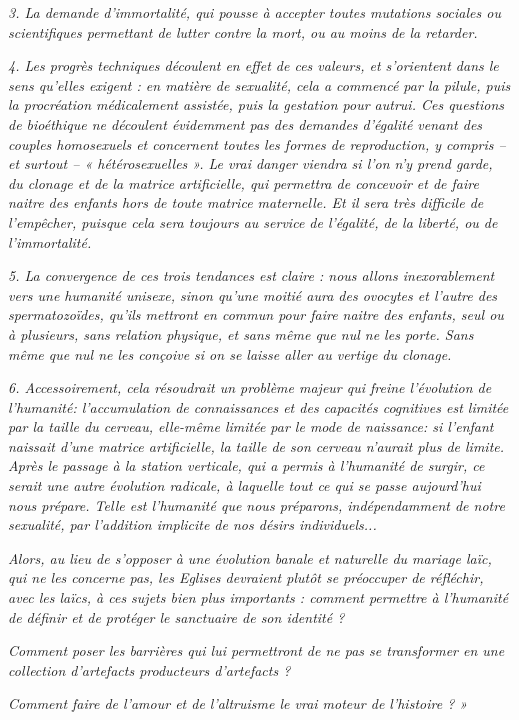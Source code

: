 \begin{displayquote}
\emph{3. La demande d'immortalité, qui pousse à accepter toutes mutations sociales ou scientifiques permettant de lutter contre la mort, ou au moins de la retarder.}

\emph{4. Les progrès techniques découlent en effet de ces valeurs, et s'orientent dans le sens qu'elles exigent : en matière de sexualité, cela a commencé par la pilule, puis la procréation médicalement assistée, puis la gestation pour autrui. Ces questions de bioéthique ne découlent évidemment pas des demandes d'égalité venant des couples homosexuels et concernent toutes les formes de reproduction, y compris -- et surtout -- « hétérosexuelles ». Le vrai danger viendra si l'on n'y prend garde, du clonage et de la matrice artificielle, qui permettra de concevoir et de faire naitre des enfants hors de toute matrice maternelle. Et il sera très difficile de l'empêcher, puisque cela sera toujours au service de l'égalité, de la liberté, ou de l'immortalité.}

\emph{5. La convergence de ces trois tendances est claire : nous allons inexorablement vers une humanité unisexe, sinon qu'une moitié aura des ovocytes et l'autre des spermatozoïdes, qu'ils mettront en commun pour faire naitre des enfants, seul ou à plusieurs, sans relation physique, et sans même que nul ne les porte. Sans même que nul ne les conçoive si on se laisse aller au vertige du clonage.}

\emph{6. Accessoirement, cela résoudrait un problème majeur qui freine l'évolution de l'humanité: l'accumulation de connaissances et des capacités cognitives est limitée par la taille du cerveau, elle-même limitée par le mode de naissance: si l'enfant naissait d'une matrice artificielle, la taille de son cerveau n'aurait plus de limite. Après le passage à la station verticale, qui a permis à l'humanité de surgir, ce serait une autre évolution radicale, à laquelle tout ce qui se passe aujourd'hui nous prépare. Telle est l'humanité que nous préparons, indépendamment de notre sexualité, par l'addition implicite de nos désirs individuels...}

\emph{Alors, au lieu de s'opposer à une évolution banale et naturelle du mariage laïc, qui ne les concerne pas, les Eglises devraient plutôt se préoccuper de réfléchir, avec les laïcs, à ces sujets bien plus importants : comment permettre à l'humanité de définir et de protéger le sanctuaire de son identité ?}

\emph{Comment poser les barrières qui lui permettront de ne pas se transformer en une collection d'artefacts producteurs d'artefacts ?}

\emph{Comment faire de l'amour et de l'altruisme le vrai moteur de l'histoire ? »}
\end{displayquote}

